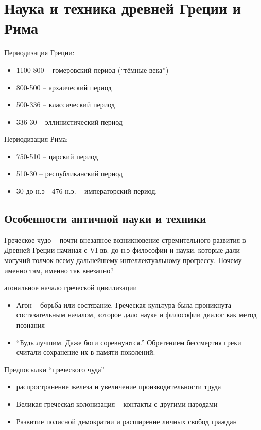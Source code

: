 \documentclass{book}
\theoremstyle{definition}
\begin{document}
    \section{Наука и техника древней Греции и Рима}

    Периодизация Греции:
    \begin{itemize}
        \item 1100-800 -- гомеровский период (``тёмные века'')
        \item 800-500 -- архаический период
        \item 500-336 -- классический период
        \item 336-30 -- эллинистический период
    \end{itemize}

    Периодизация Рима:
    \begin{itemize}
        \item  750-510 -- царский период
        \item 510-30 -- республиканский период
        \item 30 до н.э - 476 н.э. -- императорский период.
    \end{itemize}


    \subsection{Особенности античной науки и техники}

    Греческое чудо -- почти внезапное возникновение стремительного развития в Древней Греции начиная с VI вв. до н.э философии и науки, которые дали могучий толчок всему дальнейшему интеллектуальному прогрессу. Почему именно там, именно так внезапно?

    агональное начало греческой цивилизации
    \begin{itemize}
        \item  Агон -- борьба или состязание. Греческая культура была проникнута состязательным началом, которое дало науке и философии диалог как метод познания
        \item ``Будь лучшим. Даже боги соревнуются.'' Обретением бессмертия греки считали сохранение их в памяти поколений.
    \end{itemize}

    Предпосылки ``греческого чуда''
    \begin{itemize}
        \item  распространение железа и увеличение производительности труда
        \item Великая греческая колонизация -- контакты с другими народами 
        \item Развитие полисной демократии и расширение личных свобод граждан
    \end{itemize}
\end{document}
